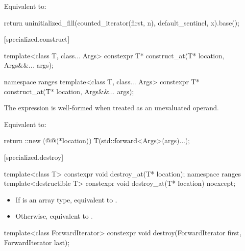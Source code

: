 \begin{itemdescr}
\pnum
\effects
Equivalent to:
\begin{codeblock}
return uninitialized_fill(counted_iterator(first, n), default_sentinel, x).base();
\end{codeblock}
\end{itemdescr}

[specialized.construct]{}

\begin{itemdecl}
template<class T, class... Args>
  constexpr T* construct_at(T* location, Args&&... args);

namespace ranges {
  template<class T, class... Args>
    constexpr T* construct_at(T* location, Args&&... args);
}
\end{itemdecl}

\begin{itemdescr}
\pnum
\constraints
The expression 
is well-formed when treated as an unevaluated operand.

\pnum
\effects
Equivalent to:
\begin{codeblock}
return ::new (@@(*location)) T(std::forward<Args>(args)...);
\end{codeblock}
\end{itemdescr}

[specialized.destroy]{}

%
\begin{itemdecl}
template<class T>
  constexpr void destroy_at(T* location);
namespace ranges {
  template<destructible T>
    constexpr void destroy_at(T* location) noexcept;
}
\end{itemdecl}

\begin{itemdescr}
\pnum
\effects
\begin{itemize}
\item If  is an array type, equivalent to
  .
\item Otherwise, equivalent to
  .
\end{itemize}
\end{itemdescr}

%
\begin{itemdecl}
template<class ForwardIterator>
  constexpr void destroy(ForwardIterator first, ForwardIterator last);
\end{itemdecl}

